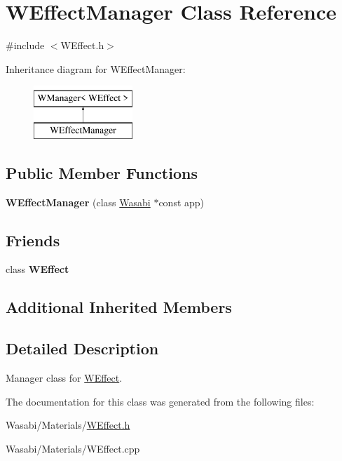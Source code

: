\hypertarget{class_w_effect_manager}{}\section{W\+Effect\+Manager Class Reference}
\label{class_w_effect_manager}


{\ttfamily \#include $<$W\+Effect.\+h$>$}

Inheritance diagram for W\+Effect\+Manager\+:\begin{figure}[H]
\begin{center}
\leavevmode
\includegraphics[height=2.000000cm]{class_w_effect_manager}
\end{center}
\end{figure}
\subsection*{Public Member Functions}
\begin{DoxyCompactItemize}
\item 
{\bfseries W\+Effect\+Manager} (class \hyperlink{class_wasabi}{Wasabi} $\ast$const app)\hypertarget{class_w_effect_manager_ae065b7bb69af912cfa04d6fd120261c0}{}\label{class_w_effect_manager_ae065b7bb69af912cfa04d6fd120261c0}

\end{DoxyCompactItemize}
\subsection*{Friends}
\begin{DoxyCompactItemize}
\item 
class {\bfseries W\+Effect}\hypertarget{class_w_effect_manager_aa862ff89ea243967dcfdb12c12ad040b}{}\label{class_w_effect_manager_aa862ff89ea243967dcfdb12c12ad040b}

\end{DoxyCompactItemize}
\subsection*{Additional Inherited Members}


\subsection{Detailed Description}
Manager class for \hyperlink{class_w_effect}{W\+Effect}. 

The documentation for this class was generated from the following files\+:\begin{DoxyCompactItemize}
\item 
Wasabi/\+Materials/\hyperlink{_w_effect_8h}{W\+Effect.\+h}\item 
Wasabi/\+Materials/W\+Effect.\+cpp\end{DoxyCompactItemize}
